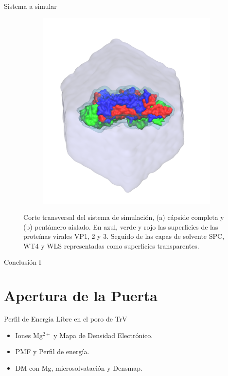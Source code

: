 \documentclass[8pt]{beamer}
\begin{document}
\begin{frame}[t]{Sistema a simular}
\begin{figure}[ht]
\begin{subfigure}[t]{.46\textwidth}
  \centering
  \includegraphics[width=1\textwidth]{Figure/TrV_Pentamer_WaterBox.png}
  \caption{}
  \label{fig:trv_pentamer_waterbox}
\end{subfigure}
\hspace*{\fill}
\caption*{\justifying Corte transversal del sistema de simulación, (a) cápside completa y (b) pentámero aislado. En azul, verde y rojo las superficies de las proteínas virales VP1, 2 y 3. Seguido de las capas de solvente SPC, WT4 y WLS representadas como superficies transparentes.}%
\end{figure}
\end{frame}


\begin{frame}[t]{Conclusión I}

\end{frame}


\section{Apertura de la Puerta}

\begin{frame}[t]{Perfil de Energía Libre en el poro de TrV}
\begin{itemize}
  \item Iones Mg$^{2+}$ y Mapa de Densidad Electrónico.
  \item PMF y Perfil de energía.
  \item DM con Mg, microsolvatación y Densmap.
\end{itemize}
\end{frame}
\end{document}
